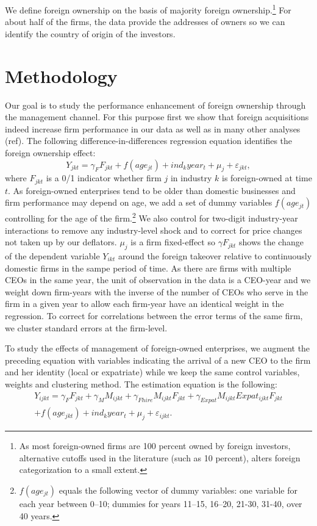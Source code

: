 \documentclass[12pt,a4paper]{article}
\begin{document}
We define foreign ownership on the basis of majority foreign ownership.\footnote{As most foreign-owned firms are 100 percent owned by foreign investors, alternative cutoffs used in the literature (such as 10 percent), alters foreign categorization to a small extent.} For about half of the firms, the data provide the addresses of owners so we can identify the country of origin of the investors.

\section{Methodology}
Our goal is to study the performance enhancement of foreign ownership through the management channel. For this purpose first we show that foreign acquisitions indeed increase firm performance in our data as well as in many other analyses (ref). The following difference-in-differences regression equation identifies the foreign ownership effect:
\begin{equation}
	Y_{jkt} = \gamma_F F_{jkt} + f(age_{jt}) + ind_{k}year_{t}+\mu_j+\varepsilon_{jkt},
\end{equation}
where $F_{jkt}$ is a 0/1 indicator whether firm $j$ in industry $k$ is foreign-owned at time $t$. As foreign-owned enterprises tend to be older than domestic businesses and firm performance may depend on age, we add a set of dummy variables $f(age_{jt})$ controlling for the age of the firm.\footnote{$f(age_{jt})$ equals the following vector of dummy variables: one variable for each year between 0--10; dummies for years 11--15, 16--20, 21-30, 31-40, over 40 years.} We also control for two-digit industry-year interactions to remove any industry-level shock and to correct for price changes not taken up by our deflators. $\mu_j$ is a firm fixed-effect so $\gamma{F_{jkt}}$ shows the change of the dependent variable $Y_{ikt}$ around the foreign takeover relative to continuously domestic firms in the sampe period of time. As there are firms with multiple CEOs in the same year, the unit of observation in the data is a CEO-year and we weight down firm-years with the inverse of the number of CEOs who serve in the firm in a given year to allow each firm-year have an identical weight in the regression. To correct for correlations between the error terms of the same firm, we cluster standard errors at the firm-level.

To study the effects of management of foreign-owned enterprises, we augment the preceding equation with variables indicating the arrival of a new CEO to the firm and her identity (local or expatriate) while we keep the same control variables, weights and clustering method. The estimation equation is the following:
\begin{equation}
\begin{split}
	Y_{ijkt} = \gamma_F F_{jkt} + \gamma_M M_{ijkt} + \gamma_{Fhire} M_{ijkt} F_{jkt} + \gamma_{Expat}  M_{ijkt} Expat_{ijkt} F_{jkt} \\
	+ f(age_{jkt}) + ind_{k}year_{t} + \mu_j+\varepsilon_{ijkt}.
\end{split}
\end{equation}
\end{document}

